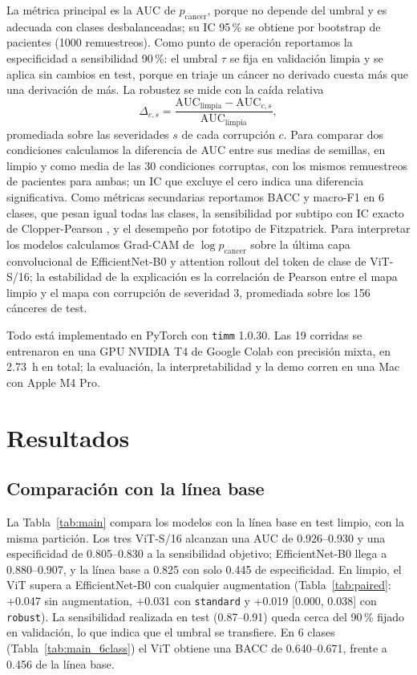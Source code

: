 \documentclass[conference]{IEEEtran}
\newcommand{\pc}{p_{\mathrm{c\acute{a}ncer}}}
\begin{document}
La métrica principal es la AUC de $\pc$, porque no depende del umbral y es adecuada con clases desbalanceadas; su IC 95\,\% se obtiene por bootstrap de pacientes \cite{efron1993} (1000 remuestreos). Como punto de operación reportamos la especificidad a sensibilidad 90\,\%: el umbral $\tau$ se fija en validación limpia y se aplica sin cambios en test, porque en triaje un cáncer no derivado cuesta más que una derivación de más. La robustez se mide con la caída relativa
\begin{equation}
\Delta_{c,s} = \frac{\mathrm{AUC}_{\mathrm{limpia}} - \mathrm{AUC}_{c,s}}{\mathrm{AUC}_{\mathrm{limpia}}},
\end{equation}
promediada sobre las severidades $s$ de cada corrupción $c$. Para comparar dos condiciones calculamos la diferencia de AUC entre sus medias de semillas, en limpio y como media de las 30 condiciones corruptas, con los mismos remuestreos de pacientes para ambas; un IC que excluye el cero indica una diferencia significativa. Como métricas secundarias reportamos BACC y macro-F1 en 6 clases, que pesan igual todas las clases, la sensibilidad por subtipo con IC exacto de Clopper-Pearson \cite{clopper1934}, y el desempeño por fototipo de Fitzpatrick. Para interpretar los modelos calculamos Grad-CAM \cite{selvaraju2017} de $\log\pc$ sobre la última capa convolucional de EfficientNet-B0 y attention rollout \cite{abnar2020} del token de clase de ViT-S/16; la estabilidad de la explicación es la correlación de Pearson entre el mapa limpio y el mapa con corrupción de severidad 3, promediada sobre los 156 cánceres de test.

Todo está implementado en PyTorch con \texttt{timm} 1.0.30. Las 19 corridas se entrenaron en una GPU NVIDIA T4 de Google Colab con precisión mixta, en 2.73~h en total; la evaluación, la interpretabilidad y la demo corren en una Mac con Apple M4 Pro.

\section{Resultados}
\label{sec:results}

\subsection{Comparación con la línea base}
La Tabla~\ref{tab:main} compara los modelos con la línea base en test limpio, con la misma partición. Los tres ViT-S/16 alcanzan una AUC de 0.926--0.930 y una especificidad de 0.805--0.830 a la sensibilidad objetivo; EfficientNet-B0 llega a 0.880--0.907, y la línea base a 0.825 con solo 0.445 de especificidad. En limpio, el ViT supera a EfficientNet-B0 con cualquier augmentation (Tabla~\ref{tab:paired}: +0.047 sin augmentation, +0.031 con \texttt{standard} y +0.019 [0.000, 0.038] con \texttt{robust}). La sensibilidad realizada en test (0.87--0.91) queda cerca del 90\,\% fijado en validación, lo que indica que el umbral se transfiere. En 6 clases (Tabla~\ref{tab:main_6class}) el ViT obtiene una BACC de 0.640--0.671, frente a 0.456 de la línea base.
\end{document}
